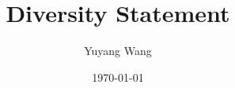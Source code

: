



\title{Diversity Statement}
\def\rsCustom{}

\author{Yuyang Wang}
\date{\today}
\makeatletter
\fancyfoot[L]{\scshape \MakeLowercase{\@author}}
\fancyfoot[R]{{\scshape \MakeLowercase{\@title}}\quad{\LARGE\sfrac{\thepage}{\pageref*{LastPage}}}}
\makeatother



\maketitle%
\thispagestyle{fancy}


\rsCustom{}


\footnotesize


